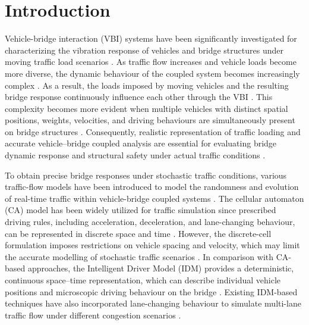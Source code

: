 \documentclass[journal]{IEEEtran}
\begin{document}
\vspace{-3pt}
\section{Introduction}

Vehicle-bridge interaction (VBI) systems have been significantly investigated for characterizing the vibration response of vehicles and bridge structures under moving traffic load scenarios \cite{han2024,yin2025,huang2026,mei2025}. As traffic flow increases and vehicle loads become more diverse, the dynamic behaviour of the coupled system becomes increasingly complex \cite{aloisio2023,lifeng2023}. As a result, the loads imposed by moving vehicles and the resulting bridge response continuously influence each other through the VBI \cite{kreslin2024,shi2024,yau2024}. This complexity becomes more evident when multiple vehicles with distinct spatial positions, weights, velocities, and driving behaviours are simultaneously present on bridge structures \cite{yin2023,wei2025}. Consequently, realistic representation of traffic loading and accurate vehicle--bridge coupled analysis are essential for evaluating bridge dynamic response and structural safety under actual traffic conditions \cite{cantero2024,dong2023}.

To obtain precise bridge responses under stochastic traffic conditions, various traffic-flow models have been introduced to model the randomness and evolution of real-time traffic within vehicle-bridge coupled systems \cite{huang2026,wang2024}. The cellular automaton (CA) model has been widely utilized for traffic simulation since prescribed driving rules, including acceleration, deceleration, and lane-changing behaviour, can be represented in discrete space and time \cite{rickert1996,ruan2017}. However, the discrete-cell formulation imposes restrictions on vehicle spacing and velocity, which may limit the accurate modelling of stochastic traffic scenarios \cite{ruan2017}. In comparison with CA-based approaches, the Intelligent Driver Model (IDM) provides a deterministic, continuous space--time representation, which can describe individual vehicle positions and microscopic driving behaviour on the bridge \cite{treiber2000,geng2023,liu2023}. Existing IDM-based techniques have also incorporated lane-changing behaviour to simulate multi-lane traffic flow under different congestion scenarios \cite{caprani2016,obrien2015,xiong2020}.
\end{document}
